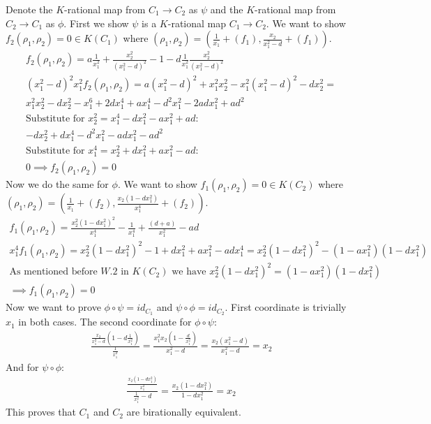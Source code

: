 \documentclass[12pt, a4paper]{article}
\begin{document}
Denote the $K$-rational map from $C_1 \rightarrow C_2$ as $\psi$ and the $K$-rational map from $C_2 \rightarrow C_1$ as $\phi$. First we show $\psi$ is a $K$-rational map $C_1 \rightarrow C_2$. We want to show $f_2(\rho_1, \rho_2) = 0 \in K(C_1)$ where $(\rho_1, \rho_2) = \left( \frac{1}{x_1} + (f_1), \frac{x_2}{x_1^2-d} + (f_1) \right)$.
\begin{gather*}
f_2(\rho_1, \rho_2) = a\frac{1}{x_1^2} + \frac{x_2^2}{(x_1^2-d)^2} - 1 -d\frac{1}{x_1^2}\frac{x_2^2}{(x_1^2-d)^2}\\
(x_1^2-d)^2x_1^2f_2(\rho_1, \rho_2) = a(x_1^2-d)^2+x_1^2x_2^2-x_1^2(x_1^2-d)^2-dx_2^2 = \\
x_1^2x_2^2-dx_2^2-x_1^6+2dx_1^4+ax_1^4-d^2x_1^2-2adx_1^2+ad^2\\
\text{Substitute for $x_2^2 = x_1^4-dx_1^2-ax_1^2+ad$:}\\
-dx_2^2+dx_1^4-d^2x_1^2-adx_1^2-ad^2\\
\text{Substitute for $x_1^4 = x_2^2+dx_1^2+ax_1^2-ad$:}\\
0 \implies f_2(\rho_1, \rho_2) = 0
\end{gather*}
Now we do the same for $\phi$. We want to show $f_1(\rho_1, \rho_2) = 0 \in K(C_2)$ where $(\rho_1, \rho_2) = \left( \frac{1}{x_1} + (f_2), \frac{x_2(1-dx_1^2)}{x_1^4} + (f_2) \right)$.
\begin{gather*}
f_1(\rho_1, \rho_2) = \frac{x_2^2(1-dx_1^2)^2}{x_1^4} - \frac{1}{x_1^4} + \frac{(d+a)}{x_1^2}-ad\\
x_1^4f_1(\rho_1, \rho_2) = x_2^2(1-dx_1^2)^2-1+dx_1^2+ax_1^2-adx_1^4 = x_2^2(1-dx_1^2)^2 - (1-ax_1^2)(1-dx_1^2)\\
\text{As mentioned before $W.2$ in $K(C_2)$ we have $x_2^2(1-dx_1^2)^2 = (1-ax_1^2)(1-dx_1^2)$}\\
\implies f_1(\rho_1, \rho_2) = 0
\end{gather*}
Now we want to prove $\phi \circ \psi = id_{C_1}$ and $\psi \circ \phi = id_{C_2}$. First coordinate is trivially $x_1$ in both cases. The second coordinate for $\phi \circ \psi$:
\begin{gather*}
\frac{\frac{x_2}{x_1^2-d}\left(1- d\frac{1}{x_1^2} \right)}{\frac{1}{x_1^2}} = \frac{x_1^2x_2(1-\frac{d}{x_1^2})}{x_1^2-d} = \frac{x_2(x_1^2-d)}{x_1^2-d} = x_2
\end{gather*}
And for $\psi \circ \phi$:
\begin{gather*}
\frac{\frac{x_2(1-dx_1^2)}{x_1^2}}{\frac{1}{x_1^2}-d} = \frac{x_2(1-dx_1^2)}{1-dx_1^2} = x_2
\end{gather*}
This proves that $C_1$ and $C_2$ are birationally equivalent. 
\end{document}
